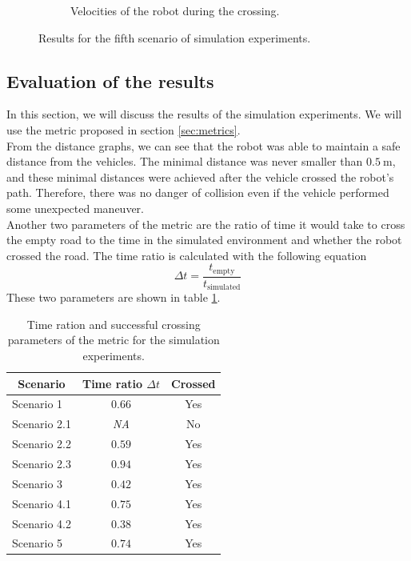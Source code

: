 \begin{figure}[H]
\begin{subfigure}{0.49\linewidth}
                    \caption{Velocities of the robot during the crossing.}
                    \label{fig:scene5_vel}
                \end{subfigure}
                \caption{Results for the fifth scenario of simulation experiments.}
                \label{fig:scene5_graphs}
            \end{figure}
    \subsection{Evaluation of the results}
        In this section, we will discuss the results of the simulation experiments. We will use the metric proposed in section \ref{sec:metrics}.\\
        From the distance graphs, we can see that the robot was able to maintain a safe distance from the vehicles. The minimal distance was never smaller than $0.5\:\si{\m}$, and these minimal distances were achieved after the vehicle crossed the robot's path. Therefore, there was no danger of collision even if the vehicle performed some unexpected maneuver.\\
        Another two parameters of the metric are the ratio of time it would take to cross the empty road to the time in the simulated environment and whether the robot crossed the road. The time ratio is calculated with the following equation
        \begin{equation}
            \Delta t = \frac{t_{\text{empty}}}{t_{\text{simulated}}}
        \end{equation}
        \noindent These two parameters are shown in table \ref{tab:met1}.
        \begin{table}[H]
            \centering
            \begin{tabular}{|c|c|c|}
                \hline
                Scenario & Time ratio $\Delta t$ & Crossed \\
                \hline\hline
                \multicolumn{1}{|l|}{Scenario 1} & $0.66$ & Yes \\
                \hline
                Scenario 2.1 & \emph{NA} & No \\
                \hline
                Scenario 2.2 & $0.59$ & Yes \\
                \hline
                Scenario 2.3 & $0.94$ & Yes \\
                \hline
                \multicolumn{1}{|l|}{Scenario 3} & $0.42$ & Yes \\
                \hline
                Scenario 4.1 & $0.75$ & Yes \\
                \hline
                Scenario 4.2 & $0.38$ & Yes \\
                \hline
                \multicolumn{1}{|l|}{Scenario 5} & $0.74$ & Yes \\
                \hline
            \end{tabular}
            \caption{Time ration and successful crossing parameters of the metric for the simulation experiments.}
            \label{tab:met1}
        \end{table}
